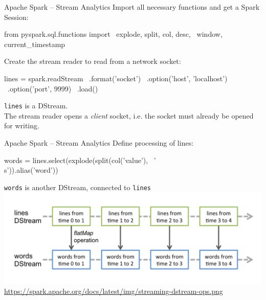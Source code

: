 \documentclass[ignorenonframetext,xcolor=x11names]{beamer}
\begin{document}

\begin{frame}[fragile]{Apache Spark -- Stream Analytics}
Import all necessary functions and get a Spark Session:
\begin{pythoncode}
from pyspark.sql.functions import \
    explode, split, col, desc, \
    window, current_timestamp
\end{pythoncode}
Create the stream reader to read from a network socket:
\begin{pythoncode}
lines = spark.readStream \
             .format('socket') \
             .option('host', 'localhost') \
             .option('port', 9999) \
             .load()
\end{pythoncode}
\texttt{lines} is a DStream. \\

The stream reader opens a \emph{client} socket, i.e. the socket must already be opened for writing.
\end{frame}

\begin{frame}[fragile]{Apache Spark -- Stream Analytics}
Define processing of lines:
\begin{pythoncode}
words = lines.select(explode(split(col('value'), \
    '\\s')).alias('word'))
\end{pythoncode}
\texttt{words} is another DStream, connected to \texttt{lines} \\

\includegraphics[width=\textwidth]{streaming-dstream-ops.png}
\scriptsize\url{https://spark.apache.org/docs/latest/img/streaming-dstream-ops.png}\normalsize

\end{frame}
\end{document}
